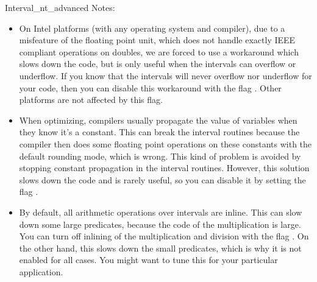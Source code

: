 \begin{ccRefClass} {Interval_nt_advanced}
Notes:\\
\begin{itemize}
\item On Intel platforms (with any operating system and compiler), due to a
      misfeature of the floating point unit, which does not handle exactly
      IEEE compliant operations on doubles, we are forced to use a workaround
      which slows down the code, but is only useful when the intervals can
      overflow or underflow.  If you know that the intervals will never
      overflow nor underflow for your code, then you can disable this
      workaround with the flag .
      Other platforms are not affected by this flag.
\item When optimizing, compilers usually propagate the value of variables when
      they know it's a constant.  This can break the interval routines because
      the compiler then does some floating point operations on these constants
      with the default rounding mode, which is wrong.  This kind of problem
      is avoided by stopping constant propagation in the interval routines.
      However, this solution slows down the code and is rarely useful, so you
      can disable it by setting the flag
      .
\item By default, all arithmetic operations over intervals are inline.  This
      can slow down some large predicates, because the code of the
      multiplication is large.  You can turn off inlining of the
      multiplication and division with the flag .
      On the other hand, this slows down the small predicates, which is why
      it is not enabled for all cases.
      You might want to tune this for your particular application.
\end{itemize}

\end{ccRefClass}
\renewcommand\ccRefPageBegin{}
\renewcommand\ccRefPageEnd{}



